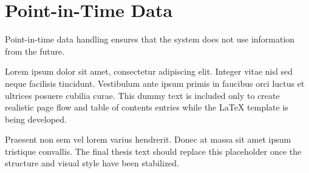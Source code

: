 \section{Point-in-Time Data}

Point-in-time data handling ensures that the system does not use information from the future.

Lorem ipsum dolor sit amet, consectetur adipiscing elit. Integer vitae nisl sed neque facilisis tincidunt. Vestibulum ante ipsum primis in faucibus orci luctus et ultrices posuere cubilia curae. This dummy text is included only to create realistic page flow and table of contents entries while the LaTeX template is being developed.

Praesent non sem vel lorem varius hendrerit. Donec at massa sit amet ipsum tristique convallis. The final thesis text should replace this placeholder once the structure and visual style have been stabilized.

